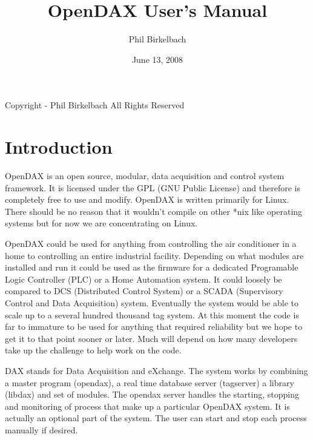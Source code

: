 

\title{OpenDAX User's Manual}
\date{June 13, 2008}
\author{Phil Birkelbach}



	\maketitle
	
	\begin{flushleft}
		Copyright  - Phil Birkelbach\linebreak
		All Rights Reserved
	\end{flushleft}
	
	\tableofcontents
	\newpage
	\chapter{Introduction}
	OpenDAX is an open source, modular, data acquisition and control system
	framework. It is licensed under the GPL (GNU Public License) and therefore is
	completely free to use and modify. OpenDAX is written primarily for Linux. 
	There should be no reason that it wouldn't compile on other *nix like operating
	systems but for now we are concentrating on Linux.
	
	OpenDAX could be used for anything from controlling the air conditioner in a
	home to controlling an entire industrial facility. Depending on what modules are
	installed and run it could be used as the firmware for a dedicated Programable
	Logic Controller (PLC) or a Home Automation system. It could loosely be compared
	to DCS (Distributed Control System) or a SCADA (Supervisory Control and Data
	Acquisition) system. Eventually the system would be able to scale up to a
	several hundred thousand tag system. At this moment the code is far to immature
	to be used for anything that required reliability but we hope to get it to that
	point sooner or later. Much will depend on how many developers take up the
	challenge to help work on the code.
	
	DAX stands for Data Acquisition and eXchange. The system works by combining a
	master program (opendax), a real time database server (tagserver) a library
	(libdax) and set of modules. The opendax server handles the starting, stopping
	and monitoring of process that make up a particular OpenDAX system.  It is
	actually an optional part of the system.  The user can start and stop each
	process manually if desired.
	

